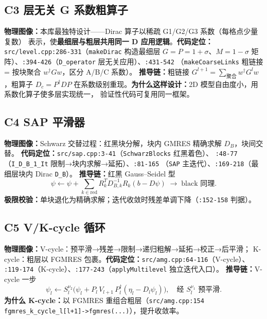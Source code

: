 \documentclass[UTF8]{ctexart}
\begin{document}
\subsection{C3 层无关 G 系数粗算子}
\textbf{物理图像：}本库最独特设计——Dirac 算子以稀疏 G1/G2/G3 系数（每格点少量复数）
表示，使\textbf{最细层与粗层共用同一 D 应用逻辑}。\textbf{代码定位：}
\texttt{src/level.cpp:286-331}（\texttt{makeDirac} 构造最细层 $G=P=1+\sigma$、$M=1-\sigma$
矩阵）、\texttt{:394-426}（\texttt{D\_operator} 层无关应用）、\texttt{:431-542}
（\texttt{makeCoarseLinks} 粗链接 = 按块聚合 $w^\dagger G w$，区分 A/B/C 系数）。
\textbf{推导链：}粗链接 $G^{l+1} = \sum_{\text{聚合}} w^\dagger G^l w$，粗算子 $D_c = P^\dagger D P$
在系数级别重现。\textbf{为什么这样设计：}2D 模型自由度小，用系数化算子使多层实现统一，
验证性代码可复用同一框架。

\subsection{C4 SAP 平滑器}
\textbf{物理图像：}Schwarz 交替过程：红黑块分解，块内 GMRES 精确求解 $D_B$，块间交替。
\textbf{代码定位：}\texttt{src/sap.cpp:3-41}（\texttt{SchwarzBlocks} 红黑着色）、
\texttt{:48-77}（\texttt{I\_D\_B\_1\_It} 限制→块内求解→延拓）、\texttt{:81-165}
（\texttt{SAP} 主迭代）、\texttt{:169-218}（最细层块内 Dirac \texttt{D\_B}）。
\textbf{推导链：}红黑 Gauss--Seidel 型
\begin{equation}\label{eq:sap}
\psi \leftarrow \psi + \sum_{k\in \text{red}} R_k^T D_{B,k}^{-1} R_k(b - D\psi) \;\rightarrow\; \text{black 同理}.
\end{equation}
\textbf{极限校验：}单块退化为精确求解；迭代收敛时残差单调下降（\texttt{:152-158} 判据）。

\subsection{C5 V/K-cycle 循环}
\textbf{物理图像：}V-cycle：预平滑→残差→限制→递归粗解→延拓→校正→后平滑；
K-cycle：粗层以 FGMRES 包裹。\textbf{代码定位：}\texttt{src/amg.cpp:64-116}（V-cycle）、
\texttt{:119-174}（K-cycle）、\texttt{:177-243}（\texttt{applyMultilevel} 独立迭代入口）。
\textbf{推导链：}V-cycle 一步
\begin{equation}\label{eq:v}
\psi_l \leftarrow S_l^{\nu_2}\big(\psi_l + P_l\, V_{l+1}\, P_l^\dagger(\eta_l - D_l\psi_l)\big),\quad \text{经 } S_l^{\nu_1} \text{ 预平滑}.
\end{equation}
\textbf{为什么 K-cycle：}以 FGMRES 重组合粗层（\texttt{\nolinkurl{src/amg.cpp:154}}
\nolinkurl{fgmres_k_cycle_l[l+1]->fgmres(...)}），提升收敛率。
\end{document}
